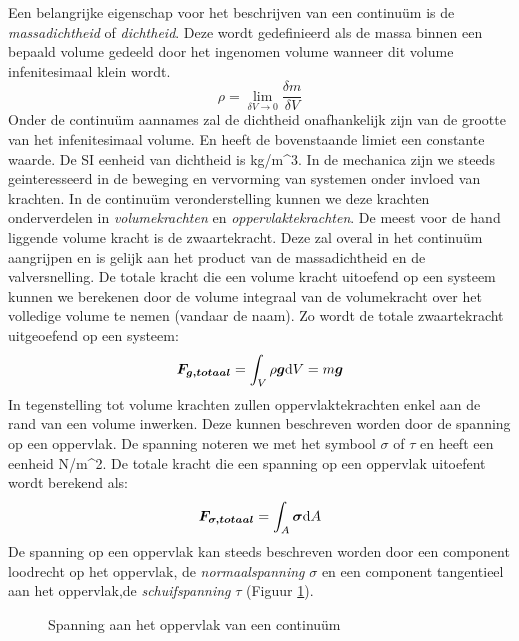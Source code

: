 Een belangrijke eigenschap voor het beschrijven van een continu\"um is de \emph{massadichtheid} of \emph{dichtheid}. Deze wordt gedefinieerd als de massa binnen een bepaald volume gedeeld door het ingenomen volume wanneer dit volume infenitesimaal klein wordt. 
\begin{equation}
	\rho = \lim_{\delta V \to 0} \frac{\delta m}{\delta V}
	\label{eqn:dichtheid}
\end{equation}
Onder de continu\"um aannames zal de dichtheid onafhankelijk zijn van de grootte van het infenitesimaal volume. En heeft de bovenstaande limiet een constante waarde. De SI eenheid van dichtheid is \unit{}{kg/m^3}.
\npar
In de mechanica zijn we steeds geinteresseerd in de beweging en vervorming van systemen onder invloed van krachten. In de continu\"um veronderstelling kunnen we deze krachten onderverdelen in \emph{volumekrachten} en \emph{oppervlaktekrachten}. De meest voor de hand liggende volume kracht is de zwaartekracht. Deze zal overal in het continu\"um aangrijpen en is gelijk aan het product van de massadichtheid en de valversnelling. De totale kracht die een volume kracht uitoefend op een systeem kunnen we berekenen door de volume integraal van de volumekracht over het volledige volume te nemen (vandaar de naam). Zo wordt de totale zwaartekracht uitgeoefend op een systeem:
\begin{equation}
	\boldsymbol{F_{g,totaal}} = \int_V \rho \boldsymbol{g} \mathrm{d} V = m \boldsymbol{g}
	\label{eqn:volumekracht}
\end{equation}
In tegenstelling tot volume krachten zullen oppervlaktekrachten enkel aan de rand van een volume inwerken. Deze kunnen beschreven worden door de spanning op een oppervlak. De spanning noteren we met het symbool $\sigma$ of $\tau$ en heeft een eenheid  \unit{}{N/m^2}. De totale kracht die een spanning op een oppervlak uitoefent wordt berekend als: 
\begin{equation}
	\boldsymbol{F_{\sigma,totaal}} = \int_A \boldsymbol{\sigma} \mathrm{d} A
	\label{eqn:oppervlaktekracht}
\end{equation}
De spanning op een oppervlak kan steeds beschreven worden door een component loodrecht op het oppervlak, de \emph{normaalspanning} $\sigma$ en een component tangentieel aan het oppervlak,de \emph{schuifspanning} $\tau$ (Figuur \ref{fig:spanning}).
\begin{figure}[htb]
	\centering
	
	\caption{Spanning aan het oppervlak van een continu\"um}
	\label{fig:spanning}
\end{figure}

